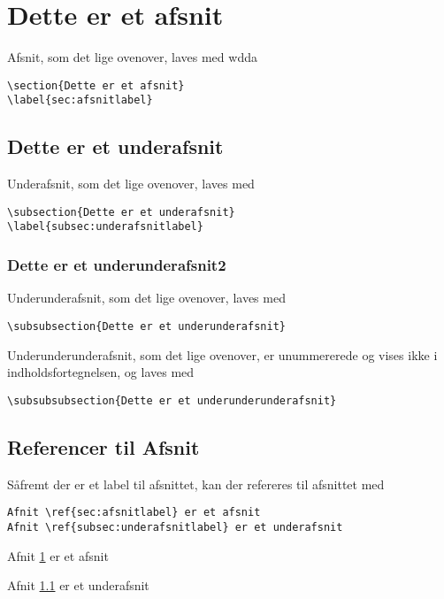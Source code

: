 \section{Dette er et afsnit}
\label{sec:afsnitlabel}
Afsnit, som det lige ovenover, laves med
wdda
\begin{verbatim}
\section{Dette er et afsnit}
\label{sec:afsnitlabel}
\end{verbatim}

\subsection{Dette er et underafsnit}
\label{subsec:underafsnitlabel}
Underafsnit, som det lige ovenover, laves med

\begin{verbatim}
\subsection{Dette er et underafsnit}
\label{subsec:underafsnitlabel}
\end{verbatim}

\subsubsection{Dette er et underunderafsnit2}
Underunderafsnit, som det lige ovenover, laves med

\begin{verbatim}
\subsubsection{Dette er et underunderafsnit}
\end{verbatim}

Underunderunderafsnit, som det lige ovenover, er unummererede og vises ikke i indholdsfortegnelsen, og laves med

\begin{verbatim}
\subsubsubsection{Dette er et underunderunderafsnit}
\end{verbatim}

\subsection{Referencer til Afsnit}
Såfremt der er et label til afsnittet, kan der refereres til afsnittet med

\begin{verbatim}
Afnit \ref{sec:afsnitlabel} er et afsnit
Afnit \ref{subsec:underafsnitlabel} er et underafsnit
\end{verbatim}

Afnit \ref{sec:afsnitlabel} er et afsnit

Afnit \ref{subsec:underafsnitlabel} er et underafsnit